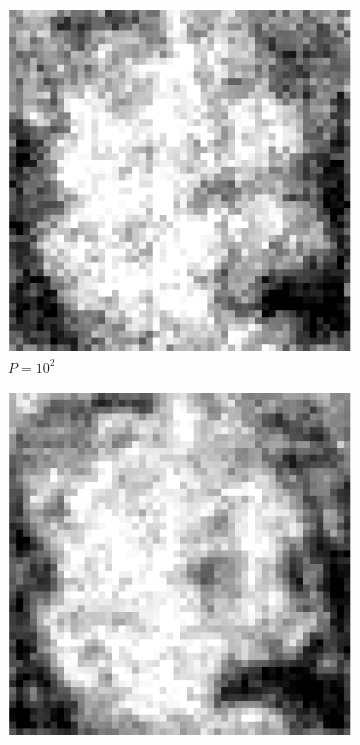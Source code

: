 \documentclass[english,11pt]{article}
\theoremstyle{plain}
\theoremstyle{definition}
\theoremstyle{remark}
\theoremstyle{plain}
\begin{document}
\begin{figure}[h!]
	\centering
	\begin{subfigure}[h]{0.25\textwidth}
		\centering
		\includegraphics[scale=0.4]{Einstein_100}
		\caption{$P =10^2$}
	\end{subfigure}%
	\begin{subfigure}[h]{0.25\textwidth}
		\centering
		\includegraphics[scale=0.4]{Einstein_1e3}

\end{subfigure}
\end{figure}
\end{document}
